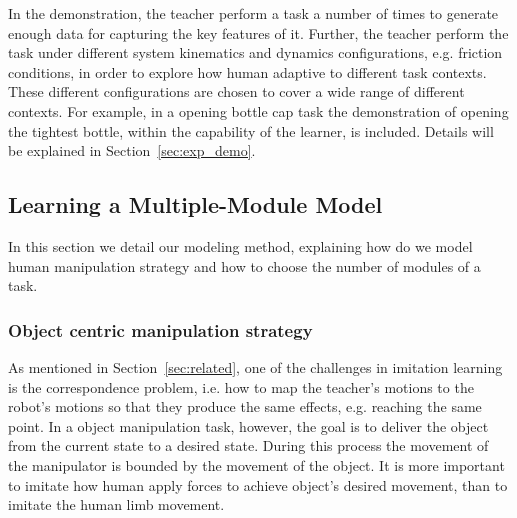 
In the demonstration, the teacher perform a task a number of times to generate enough data for capturing the key features of it. Further, the teacher perform the task under different system kinematics and dynamics configurations, e.g. friction conditions, in order to explore how human adaptive to different task contexts. These different configurations are chosen to cover a wide range of different contexts. For example, in a opening bottle cap task the demonstration of opening the tightest bottle, within the capability of the learner, is included. Details will be explained in Section~\ref{sec:exp_demo}.



\subsection{Learning a Multiple-Module Model}
\label{sec:learn}
In this section we detail our modeling method, explaining how do we model human manipulation strategy and how to choose the number of modules of a task.

\subsubsection{Object centric manipulation strategy}
\label{sec:objectlevel}
As mentioned in Section~\ref{sec:related}, one of the challenges in imitation learning is the correspondence problem, i.e. how to map the teacher's motions to the robot's motions so that they produce the same effects, e.g. reaching the same point. %
In a object manipulation task, however, the goal is to deliver the object from the current state to a desired state. During this process the movement of the manipulator is bounded by the movement of the object. It is more important to imitate how human apply forces to achieve object's desired movement, than to imitate the human limb movement.

